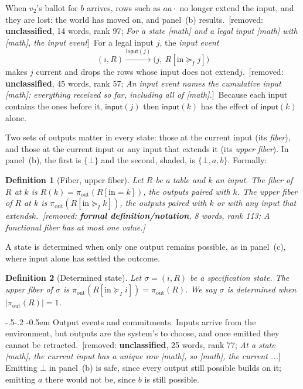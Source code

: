\documentclass[sigconf]{cidr-2027}
\makeatletter
\newtheorem{definition}{Definition}
\theoremstyle{remark}
\renewcommand\paragraph{\@startsection{paragraph}{4}{\z@}%
  {-.5\baselineskip \@plus -2\p@ \@minus -.2\p@}%
  {-0.5em}%
  {\normalfont\bfseries}}
\newcommand{\InputGe}{\succeq_I}
\newcommand{\commitments}{commitments\xspace}
\newcommand{\inrel}{extends\xspace}          %
\newcommand{\inrelbase}{extend\xspace}       %
\newcommand{\removednote}[1]{{\color{cutred}\footnotesize\,[removed: #1]\,}}
\makeatother
\begin{document}
When $v_2$'s ballot for $b$ arrives, rows such as $aa\cdot$ no longer extend
the input, and they are lost: the world has moved on, and panel~(b) results. \removednote{\textbf{unclassified}, 14 words, rank 97; \textit{For a state [math] and a legal input [math] with [math], the input event}} \textcolor{newblue}{For a legal input $j$, the \emph{input event}}
\begin{equation}
  (i,R)\xrightarrow{\mathsf{input}(j)}
  \bigl(j,\ R[\mathrm{in}\InputGe j]\bigr)
  \label{eq:input-event}
\end{equation}
\textcolor{newblue}{makes $j$ current and drops the rows whose input does not \inrelbase $j$.} \removednote{\textbf{unclassified}, 45 words, rank 57; \textit{An input event names the cumulative input [math]: everything received so far, including all of [math].}} \textcolor{newblue}{Because each input contains the ones before it, $\mathsf{input}(j)$ then
$\mathsf{input}(k)$ has the effect of $\mathsf{input}(k)$ alone.}

Two sets of outputs matter in every state: those at the current
input (its \emph{fiber}), and those at the current input or any input that
\inrel it (its \emph{upper fiber}). In panel~(b), the
first is $\{\bot\}$ and the second, shaded, is $\{\bot,a,b\}$. Formally:

\begin{definition}[Fiber, upper fiber]
\label{def:fiber}
Let $R$ be a table and $k$ an input. The \emph{fiber} of $R$ at $k$ is
$R(k)=\pi_{\mathrm{out}}(R[\mathrm{in}=k])$, the outputs paired with $k$. The
\emph{upper fiber} of $R$ at $k$ is $\pi_{\mathrm{out}}(R[\mathrm{in}\InputGe
k])$, the outputs paired with $k$ or with any input that \inrel $k$. \removednote{\textbf{formal definition/notation}, 8 words, rank 113; \textit{A functional fiber has at most one value.}}
\end{definition}

A state is determined when only one output remains possible, as in panel~(c),
where input alone has settled the outcome.

\begin{definition}[Determined state]
\label{def:determined}
Let $\sigma = (i, R)$ be a specification state. The upper fiber of $\sigma$
is $\pi_{\mathrm{out}}(R[\mathrm{in}\InputGe i]) = \pi_{\mathrm{out}}(R)$. We say $\sigma$ is \emph{determined} when $|\pi_{\mathrm{out}}(R)|=1$.
\end{definition}

\paragraph{Output events and \commitments.}
Inputs arrive from the environment, but outputs are the system's to choose, and
once emitted they cannot be retracted. \removednote{\textbf{unclassified}, 25 words, rank 77; \textit{At a state [math], the current input has a unique row [math], so [math], the current ...}} Emitting $\bot$ in panel~(b) is safe,
since every output still possible builds on it; emitting $a$ there would not
be, since $b$ is still possible.
\end{document}
